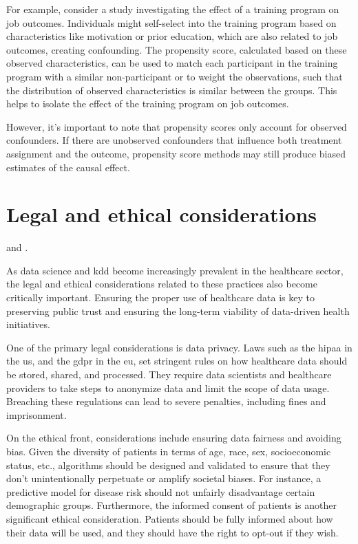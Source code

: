 \begin{enumerate}
    For example, consider a study investigating the effect of a training program on job outcomes. Individuals might self-select into the training program based on characteristics like motivation or prior education, which are also related to job outcomes, creating confounding. The propensity score, calculated based on these observed characteristics, can be used to match each participant in the training program with a similar non-participant or to weight the observations, such that the distribution of observed characteristics is similar between the groups. This helps to isolate the effect of the training program on job outcomes.
    
    However, it's important to note that propensity scores only account for observed confounders. If there are unobserved confounders that influence both treatment assignment and the outcome, propensity score methods may still produce biased estimates of the causal effect.
    
\end{enumerate}

\section{Legal and ethical considerations}

and \cite{EthicsGuidelinesTrustworthy2019}.

As data science and \ac{kdd} become increasingly prevalent in the healthcare sector, the legal and ethical considerations related to these practices also become critically important. Ensuring the proper use of healthcare data is key to preserving public trust and ensuring the long-term viability of data-driven health initiatives.

One of the primary legal considerations is data privacy. Laws such as the \ac{hipaa} in the \ac{us}, and the \ac{gdpr} in the \ac{eu}, set stringent rules on how healthcare data should be stored, shared, and processed. They require data scientists and healthcare providers to take steps to anonymize data and limit the scope of data usage. Breaching these regulations can lead to severe penalties, including fines and imprisonment.

On the ethical front, considerations include ensuring data fairness and avoiding bias. Given the diversity of patients in terms of age, race, sex, socioeconomic status, etc., algorithms should be designed and validated to ensure that they don't unintentionally perpetuate or amplify societal biases. For instance, a predictive model for disease risk should not unfairly disadvantage certain demographic groups. Furthermore, the informed consent of patients is another significant ethical consideration. Patients should be fully informed about how their data will be used, and they should have the right to opt-out if they wish.

